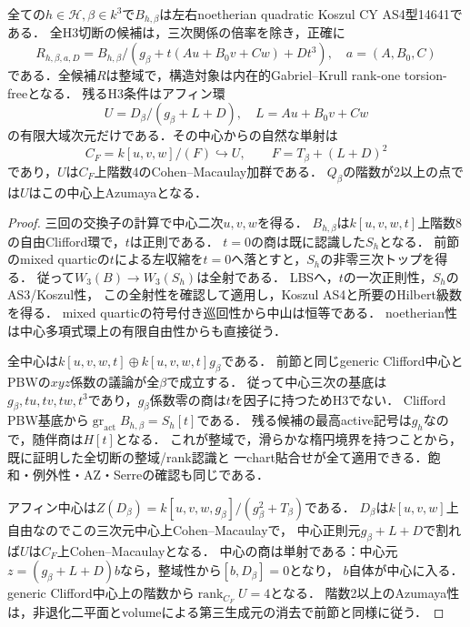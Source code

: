 \begin{lemma}[全定数項での包絡の認識と中心]
\label{lem:beta-envelope-center}
全ての$h\in\mathcal H,\beta\in k^3$で$B_{h,\beta}$は左右noetherian quadratic Koszul CY AS4型14641である．
全H3切断の候補は，三次関係の倍率を除き，正確に
\[
 R_{h,\beta,a,D}=B_{h,\beta}/(g_\beta+t(Au+B_0v+Cw)+Dt^3),\quad a=(A,B_0,C)
\]
である．全候補$R$は整域で，構造対象は内在的Gabriel--Krull rank-one torsion-freeとなる．
残るH3条件はアフィン環
\[
 U=D_\beta/(g_\beta+L+D),\quad L=Au+B_0v+Cw
\]
の有限大域次元だけである．その中心からの自然な単射は
\[
 C_F=k[u,v,w]/(F)\hookrightarrow U,\qquad F=T_\beta+(L+D)^2
\]
であり，$U$は$C_F$上階数4のCohen--Macaulay加群である．
$Q_\beta$の階数が2以上の点では$U$はこの中心上Azumayaとなる．
\end{lemma}
\begin{proof}
三回の交換子の計算で中心二次$u,v,w$を得る．
$B_{h,\beta}$は$k[u,v,w,t]$上階数8の自由Clifford環で，$t$は正則である．
$t=0$の商は既に認識した$S_h$となる．
前節のmixed quarticの$t$による左収縮を$t=0$へ落とすと，$S_h$の非零三次トップを得る．
従って$W_3(B)\to W_3(S_h)$は全射である．
LBS\cite[Theorem 2.6, Corollary 2.7]{LBS}へ，$t$の一次正則性，$S_h$のAS3/Koszul性，
この全射性を確認して適用し，Koszul AS4と所要のHilbert級数を得る．
mixed quarticの符号付き巡回性から中山は恒等である．
noetherian性は中心多項式環上の有限自由性からも直接従う．

全中心は$k[u,v,w,t]\oplus k[u,v,w,t]g_\beta$である．
前節と同じgeneric Clifford中心とPBWの$xyz$係数の議論が全$\beta$で成立する．
従って中心三次の基底は$g_\beta,tu,tv,tw,t^3$であり，$g_\beta$係数零の商は$t$を因子に持つためH3でない．
Clifford PBW基底から$\operatorname{gr}_{\mathrm{act}}B_{h,\beta}=S_h[t]$である．
残る候補の最高active記号は$g_h$なので，随伴商は$H[t]$となる．
これが整域で，滑らかな楕円境界を持つことから，既に証明した全切断の整域/rank認識と
一chart貼合せが全て適用できる．飽和・例外性・AZ・Serreの確認も同じである．

アフィン中心は$Z(D_\beta)=k[u,v,w,g_\beta]/(g_\beta^2+T_\beta)$である．
$D_\beta$は$k[u,v,w]$上自由なのでこの三次元中心上Cohen--Macaulayで，
中心正則元$g_\beta+L+D$で割れば$U$は$C_F$上Cohen--Macaulayとなる．
中心の商は単射である：中心元$z=(g_\beta+L+D)b$なら，整域性から$[b,D_\beta]=0$となり，
$b$自体が中心に入る．generic Clifford中心上の階数から$\operatorname{rank}_{C_F}U=4$となる．
階数2以上のAzumaya性は，非退化二平面とvolumeによる第三生成元の消去で前節と同様に従う．
\end{proof}

